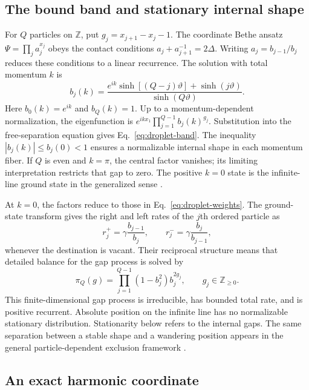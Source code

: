 \documentclass[aps,pre,reprint,amsmath,amssymb,longbibliography,floatfix]{revtex4-2}
\begin{document}
\subsection{The bound band and stationary internal shape}

For $Q$ particles on $\mathbb Z$, put
$g_j=x_{j+1}-x_j-1$. The coordinate Bethe ansatz
$\Psi=\prod_j a_j^{x_j}$ obeys the contact conditions
$a_j+a_{j+1}^{-1}=2\Delta$. Writing $a_j=b_{j-1}/b_j$ reduces these
conditions to a linear recurrence. The solution with total momentum $k$
is
\begin{equation}
 b_j(k)=\frac{e^{ik}\sinh\left[(Q-j)\vartheta\right]+
                  \sinh(j\vartheta)}{\sinh(Q\vartheta)}.
 \label{eq:droplet-complex-b}
\end{equation}
Here $b_0(k)=e^{ik}$ and $b_Q(k)=1$. Up to a momentum-dependent normalization, the eigenfunction is
$e^{ikx_1}\prod_{j=1}^{Q-1}b_j(k)^{g_j}$. Substitution into the
free-separation equation gives Eq.~\eqref{eq:droplet-band}.
The inequality $|b_j(k)|\le b_j(0)<1$ ensures a normalizable internal
shape in each momentum fiber. If $Q$ is even and $k=\pi$, the central
factor vanishes; its limiting interpretation restricts that gap to zero.
The positive $k=0$ state is the infinite-line ground state in the
generalized sense \cite{FischbacherStolz2014,NachtergaeleSpitzerStarr2007}.

At $k=0$, the factors reduce to those in
Eq.~\eqref{eq:droplet-weights}. The ground-state transform gives the
right and left rates of the $j$th ordered particle as
\begin{equation}
 r_j^+=\gamma\frac{b_{j-1}}{b_j},\qquad
 r_j^-=\gamma\frac{b_j}{b_{j-1}},
 \label{eq:droplet-rank-rates}
\end{equation}
whenever the destination is vacant. Their reciprocal structure means
that detailed balance for the gap process is solved by
\begin{equation}
 \pi_Q(g)=\prod_{j=1}^{Q-1}(1-b_j^2)b_j^{2g_j},
 \qquad g_j\in\mathbb Z_{\ge0}.
 \label{eq:droplet-gap-measure}
\end{equation}
This finite-dimensional gap process is irreducible, has bounded total
rate, and is positive recurrent. Absolute position on the infinite line
has no normalizable stationary distribution. Stationarity below refers
to the internal gaps. The same separation between a stable shape and a
wandering position appears in the general particle-dependent exclusion
framework \cite{MalyshevMenshikovPopovWade2023}.

\subsection{An exact harmonic coordinate}
\end{document}
